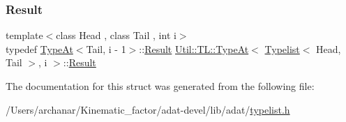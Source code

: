 \subsubsection{\texorpdfstring{Result}{Result}\hspace{0.1cm}{\footnotesize\ttfamily [3/3]}}
{\footnotesize\ttfamily template$<$class Head , class Tail , int i$>$ \\
typedef \mbox{\hyperlink{structUtil_1_1TL_1_1TypeAt}{Type\+At}}$<$Tail, i -\/ 1$>$\+::\mbox{\hyperlink{structUtil_1_1TL_1_1TypeAt_3_01Typelist_3_01Head_00_01Tail_01_4_00_01i_01_4_a7ab37564c4bf2d9cfb10c84967788c5c}{Result}} \mbox{\hyperlink{structUtil_1_1TL_1_1TypeAt}{Util\+::\+T\+L\+::\+Type\+At}}$<$ \mbox{\hyperlink{structUtil_1_1Typelist}{Typelist}}$<$ Head, Tail $>$, i $>$\+::\mbox{\hyperlink{structUtil_1_1TL_1_1TypeAt_3_01Typelist_3_01Head_00_01Tail_01_4_00_01i_01_4_a7ab37564c4bf2d9cfb10c84967788c5c}{Result}}}



The documentation for this struct was generated from the following file\+:\begin{DoxyCompactItemize}
\item 
/\+Users/archanar/\+Kinematic\+\_\+factor/adat-\/devel/lib/adat/\mbox{\hyperlink{adat-devel_2lib_2adat_2typelist_8h}{typelist.\+h}}\end{DoxyCompactItemize}

